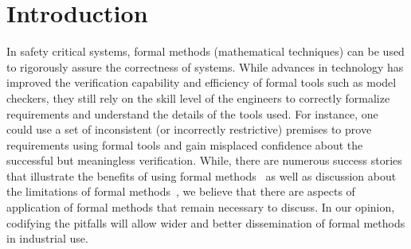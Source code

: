 \section{Introduction}
\label{sec:intro}

 
In safety critical systems, formal methods (mathematical techniques) can be used to rigorously assure the correctness of systems. %
While advances in technology has improved the verification capability and efficiency of formal tools such as model checkers, they still rely on the skill level of the engineers to correctly formalize requirements
and understand the details of the tools used. For instance, one could use a set of inconsistent (or incorrectly restrictive) premises to prove requirements using formal tools and gain misplaced confidence about the successful but meaningless verification. While, there are numerous success stories that illustrate the benefits of using formal methods~\cite{Miller03:shalls,Whalen07:FMICS} as well as discussion about the limitations of formal methods~\cite{kneuper1997limits,hall1990seven}, we believe that there are aspects of application of formal methods that remain necessary to discuss. %
In our opinion, codifying the pitfalls will allow wider and better dissemination of formal methods in industrial use.

